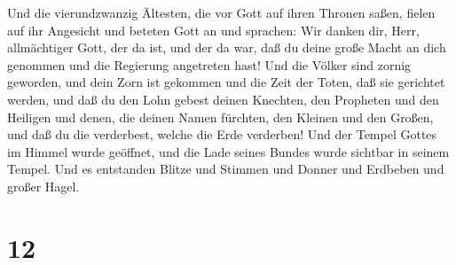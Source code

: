 Und die vierundzwanzig Ältesten, die vor Gott auf ihren Thronen saßen,
fielen auf ihr Angesicht und beteten Gott an  und
sprachen: Wir danken dir, Herr, allmächtiger Gott, der da ist, und der
da war, daß du deine große Macht an dich genommen und die Regierung
angetreten hast!  Und die Völker sind zornig geworden,
und dein Zorn ist gekommen und die Zeit der Toten, daß sie gerichtet
werden, und daß du den Lohn gebest deinen Knechten, den Propheten und
den Heiligen und denen, die deinen Namen fürchten, den Kleinen und den
Großen, und daß du die verderbest, welche die Erde verderben!
 Und der Tempel Gottes im Himmel wurde geöffnet, und die
Lade seines Bundes wurde sichtbar in seinem Tempel. Und es entstanden
Blitze und Stimmen und Donner und Erdbeben und großer Hagel.

\hypertarget{section-11}{%
\section{12}\label{section-11}}


